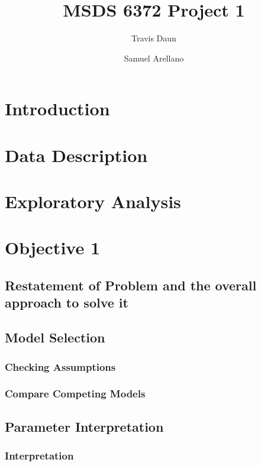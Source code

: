 \documentclass[acmsmall]{acmart}
\begin{document}
\title{MSDS 6372 Project 1}
\author{Travis Daun}
\author{Samuel Arellano}


\begin{abstract}

\end{abstract}

\maketitle
\thispagestyle{plain}
\section{Introduction}
\section{Data Description}
\section{Exploratory Analysis}
\section{Objective 1}
\subsection{Restatement of Problem and the overall approach to solve it}
\subsection{Model Selection}
\subsubsection{Checking Assumptions}
\subsubsection{Compare Competing Models}
\subsection{Parameter Interpretation}
\subsubsection{Interpretation}
\end{document}
